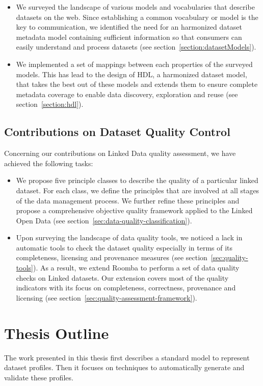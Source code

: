 \begin{itemize}
	\item We surveyed the landscape of various models and vocabularies that describe datasets on the web. Since establishing a common vocabulary or model is the key to communication, we identified the need for an harmonized dataset metadata model containing sufficient information so that consumers can easily understand and process datasets (see section~\ref{section:datasetModels}).
	\item We implemented a set of mappings between each properties of the surveyed models. This has lead to the design of HDL, a harmonized dataset model, that takes the best out of these models and extends them to ensure complete metadata coverage to enable data discovery, exploration and reuse (see section~\ref{section:hdl}).
\end{itemize}

\subsection{Contributions on Dataset Quality Control}
Concerning our contributions on Linked Data quality assessment, we have achieved the following tasks:
\begin{itemize}
	\item We propose five principle classes to describe the quality of a particular linked dataset. For each class, we define the principles that are involved at all stages of the data management process. We further refine these principles and propose a comprehensive objective quality framework applied to the Linked Open Data (see section~\ref{sec:data-quality-classification}).
	\item Upon surveying the landscape of data quality tools, we noticed a lack in automatic tools to check the dataset quality especially in terms of its completeness, licensing and provenance measures (see section~\ref{sec:quality-tools}). As a result, we extend Roomba to perform a set of data quality checks on Linked datasets. Our extension covers most of the quality indicators with its focus on completeness, correctness, provenance and licensing (see section~\ref{sec:quality-assessment-framework}).
\end{itemize}

\section{Thesis Outline} \label{sec:outline}
The work presented in this thesis first describes a standard model to represent dataset profiles. Then it focuses on techniques to automatically generate and validate these profiles.

